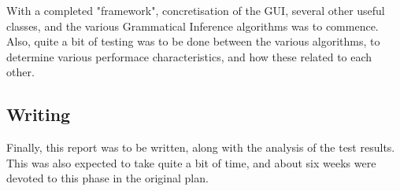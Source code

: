 With a completed "framework", concretisation of the GUI, several other
useful classes, and the various Grammatical Inference algorithms was to
commence. Also, quite a bit of testing was to be done between the various
algorithms, to determine various performace characteristics, and how these
related to each other.

\subsection{Writing}

Finally, this report was to be written, along with the analysis of the test
results. This was also expected to take quite a bit of time, and about six
weeks were devoted to this phase in the original plan.
